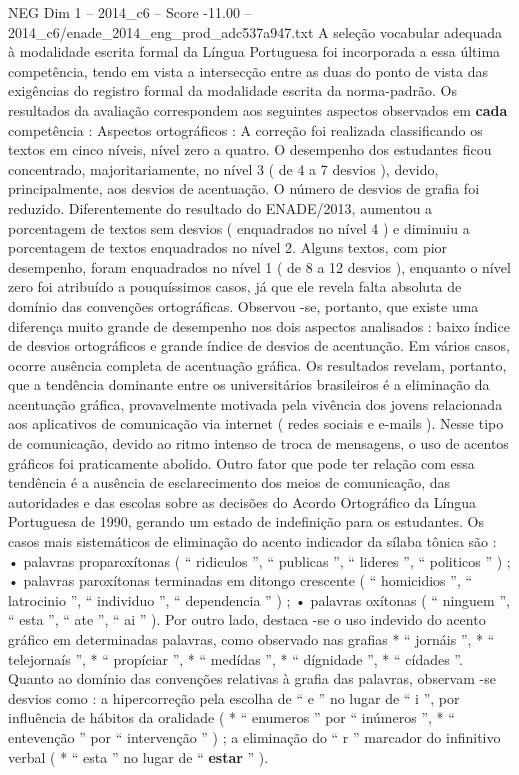 \begin{textsample}{NEG Dim 1 – 2014\_c6 – Score -11.00 – 2014\_c6/enade\_2014\_eng\_prod\_adc537a947.txt}
A seleção vocabular adequada à modalidade escrita formal da Língua Portuguesa foi incorporada a essa última competência, tendo em vista a intersecção entre as duas do ponto de vista das exigências do registro formal da modalidade escrita da norma-padrão.
Os resultados da avaliação correspondem aos seguintes aspectos observados em \textbf{cada} competência : Aspectos ortográficos : A correção foi realizada classificando os textos em cinco níveis, nível zero a quatro.
O desempenho dos estudantes ficou concentrado, majoritariamente, no nível 3 ( de 4 a 7 desvios ), devido, principalmente, aos desvios de acentuação.
O número de desvios de grafia foi reduzido.
Diferentemente do resultado do ENADE/2013, aumentou a porcentagem de textos sem desvios ( enquadrados no nível 4 ) e diminuiu a porcentagem de textos enquadrados no nível 2.
Alguns textos, com pior desempenho, foram enquadrados no nível 1 ( de 8 a 12 desvios ), enquanto o nível zero foi atribuído a pouquíssimos casos, já que ele revela falta absoluta de domínio das convenções ortográficas.
Observou -se, portanto, que existe uma diferença muito grande de desempenho nos dois aspectos analisados : baixo índice de desvios ortográficos e grande índice de desvios de acentuação.
Em vários casos, ocorre ausência completa de acentuação gráfica.
Os resultados revelam, portanto, que a tendência dominante entre os universitários brasileiros é a eliminação da acentuação gráfica, provavelmente motivada pela vivência dos jovens relacionada aos aplicativos de comunicação via internet ( redes sociais e e-mails ).
Nesse tipo de comunicação, devido ao ritmo intenso de troca de mensagens, o uso de acentos gráficos foi praticamente abolido.
Outro fator que pode ter relação com essa tendência é a ausência de esclarecimento dos meios de comunicação, das autoridades e das escolas sobre as decisões do Acordo Ortográfico da Língua Portuguesa de 1990, gerando um estado de indefinição para os estudantes.
Os casos mais sistemáticos de eliminação do acento indicador da sílaba tônica são : • palavras proparoxítonas ( “ ridiculos ”, “ publicas ”, “ lideres ”, “ politicos ” ) ; • palavras paroxítonas terminadas em ditongo crescente ( “ homicidios ”, “ latrocinio ”, “ individuo ”, “ dependencia ” ) ; • palavras oxítonas ( “ ninguem ”, “ esta ”, “ ate ”, “ ai ” ).
Por outro lado, destaca -se o uso indevido do acento gráfico em determinadas palavras, como observado nas grafias * “ jornáis ”, * “ telejornaís ”, * “ propíciar ”, * “ medídas ”, * “ dígnidade ”, * “ cídades ”.
Quanto ao domínio das convenções relativas à grafia das palavras, observam -se desvios como : a hipercorreção pela escolha de “ e ” no lugar de “ i ”, por influência de hábitos da oralidade ( * “ enumeros ” por “ inúmeros ”, * “ entevenção ” por “ intervenção ” ) ; a eliminação do “ r ” marcador do infinitivo verbal ( * “ esta ” no lugar de “ \textbf{estar} ” ).

\end{textsample}
